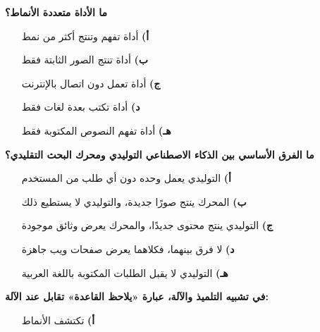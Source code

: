 \documentclass[11pt,a4paper]{article}
\begin{document}
\begin{multicols}{2}
\begin{minipage}{\linewidth}
\end{minipage}\par\vspace{7pt plus 4pt}
\noindent\begin{minipage}{\linewidth}
\hangindent=0.7cm\textbf{ما الأداة متعددة الأنماط؟}
\begin{itemize}[leftmargin=0.95cm, labelsep=4pt, itemsep=0pt, topsep=2pt, parsep=0pt]
  \item[\textbf{أ)}] أداة تفهم وتنتج أكثر من نمط
  \item[\textbf{ب)}] أداة تنتج الصور الثابتة فقط
  \item[\textbf{ج)}] أداة تعمل دون اتصال بالإنترنت
  \item[\textbf{د)}] أداة تكتب بعدة لغات فقط
  \item[\textbf{هـ)}] أداة تفهم النصوص المكتوبة فقط
\end{itemize}
\end{minipage}\par\vspace{7pt plus 4pt}
\noindent\begin{minipage}{\linewidth}
\hangindent=0.7cm\textbf{ما الفرق الأساسي بين الذكاء الاصطناعي التوليدي ومحرك البحث التقليدي؟}
\begin{itemize}[leftmargin=0.95cm, labelsep=4pt, itemsep=0pt, topsep=2pt, parsep=0pt]
  \item[\textbf{أ)}] التوليدي يعمل وحده دون أي طلب من المستخدم
  \item[\textbf{ب)}] المحرك ينتج صورًا جديدة، والتوليدي لا يستطيع ذلك
  \item[\textbf{ج)}] التوليدي ينتج محتوى جديدًا، والمحرك يعرض وثائق موجودة
  \item[\textbf{د)}] لا فرق بينهما، فكلاهما يعرض صفحات ويب جاهزة
  \item[\textbf{هـ)}] التوليدي لا يقبل الطلبات المكتوبة باللغة العربية
\end{itemize}
\end{minipage}\par\vspace{7pt plus 4pt}
\noindent\begin{minipage}{\linewidth}
\hangindent=0.7cm\textbf{في تشبيه التلميذ والآلة، عبارة «يلاحظ القاعدة» تقابل عند الآلة:}
\begin{itemize}[leftmargin=0.95cm, labelsep=4pt, itemsep=0pt, topsep=2pt, parsep=0pt]
  \item[\textbf{أ)}] تكتشف الأنماط

\end{itemize}
\end{minipage}
\end{multicols}
\end{document}
